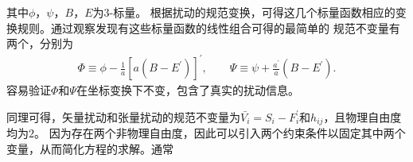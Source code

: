 其中$\phi$，$\psi$，$B$，$E$为3-标量。
根据扰动的规范变换，可得这几个标量函数相应的变换规则。通过观察发现有这些标量函数的线性组合可得的最简单的
规范不变量有两个，分别为
\begin{align}
  \label{eq:gauge-invariant-scalar}
  \Phi\equiv \phi -\frac{1}{a}{[a{\left(B-E^{\prime}\right)}]}^{\prime}
  ,\qquad
  \Psi \equiv \psi + \frac{a^{\prime}}{a}{\left(B-E^{\prime}\right)}.
\end{align}
容易验证$\Phi$和$\Psi$在坐标变换下不变，包含了真实的扰动信息。

同理可得，矢量扰动和张量扰动的规范不变量为$\bar{V_{i}}=S_{i}-F^\prime_{i}$和$h_{ij}$，且物理自由度均为$2$。
因为存在两个非物理自由度，因此可以引入两个约束条件以固定其中两个变量，从而简化方程的求解。通常

